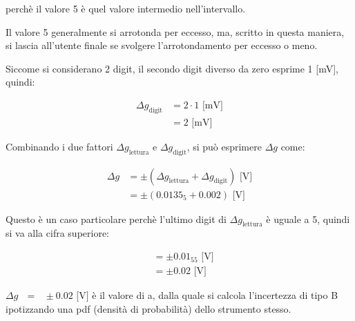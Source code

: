 perchè il valore 5 è quel valore intermedio nell'intervallo. \newline 

Il valore 5 generalmente si arrotonda per eccesso, ma, scritto in questa maniera, si lascia all'utente finale se svolgere l'arrotondamento per eccesso o meno. \newline 

Siccome si considerano 2 digit, il secondo digit diverso da zero esprime 1 [mV], quindi: 

{
    \Large 
    \begin{equation}
        \begin{split}
            \Delta g_{\text{digit}} 
            &= 
            2 \cdot 1 \text{ [mV]}
            \\ 
            &= 
            2 \text{ [mV]}
        \end{split}
    \end{equation}
}

Combinando i due fattori $\Delta g_{\text{lettura}}$ e $\Delta g_{\text{digit}} $, 
si può esprimere $\Delta g$ come: 

{
    \Large 
    \begin{equation}
        \begin{split}
            \Delta g 
            &= 
            \pm 
            (\Delta g_{\text{lettura}} + \Delta g_{\text{digit}} ) \text{ [V]} 
            \\
            &=
            \pm 
            (0.0135_{5} + 0.002) \text{ [V]}
        \end{split}
    \end{equation}
}

Questo è un caso particolare perchè l'ultimo digit di $\Delta g_{\text{lettura}}$ è uguale a 5, 
quindi si va alla cifra superiore: 

{
    \Large 
    \begin{equation}
        \begin{split}
            &= 
            \pm 
            0.01_{55} \text{ [V]}
            \\ 
            &= 
            \pm 
            0.02 \text{ [V]}
        \end{split}
    \end{equation}
}

$\Delta g \text{ }= \text{ } \pm 0.02 \text{ [V]} $ è il valore di a, 
dalla quale si calcola l'incertezza di tipo B ipotizzando una pdf (densità di probabilità) dello strumento stesso. \newline 


